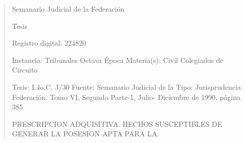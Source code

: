 \documentclass[11pt,a4paper]{article}
\begin{document}
\begin{quote}
                                                   Semanario Judicial de la Federación

                                                  Tesis

 Registro digital: 224820

 Instancia: Tribunales             Octava Época                           Materia(s): Civil
 Colegiados de Circuito

 Tesis: I.4o.C. J/30               Fuente: Semanario Judicial de la       Tipo: Jurisprudencia
                                   Federación.
                                   Tomo VI, Segunda Parte-1, Julio-
                                   Diciembre de 1990, página 385


PRESCRIPCION ADQUISITIVA. HECHOS SUSCEPTIBLES DE GENERAR LA POSESION APTA
PARA LA.



\end{quote}
\end{document}
